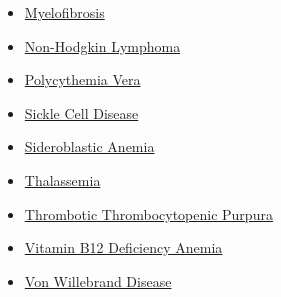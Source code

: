 \begin{itemize}[noitemsep]
  \item \hyperlink{sec:Myelofibrosis}{Myelofibrosis}
  \item \hyperlink{sec:Non-Hodgkin Lymphoma}{Non-Hodgkin Lymphoma}
  \item \hyperlink{sec:Polycythemia Vera}{Polycythemia Vera}
  \item \hyperlink{sec:Sickle Cell Disease}{Sickle Cell Disease}
  \item \hyperlink{sec:Sideroblastic Anemia}{Sideroblastic Anemia}
  \item \hyperlink{sec:Thalassemia}{Thalassemia}
  \item \hyperlink{sec:Thrombotic Thrombocytopenic Purpura}{Thrombotic Thrombocytopenic Purpura}
  \item \hyperlink{sec:Vitamin B12 Deficiency Anemia}{Vitamin B12 Deficiency Anemia}
  \item \hyperlink{sec:Von Willebrand Disease}{Von Willebrand Disease}
\end{itemize}

